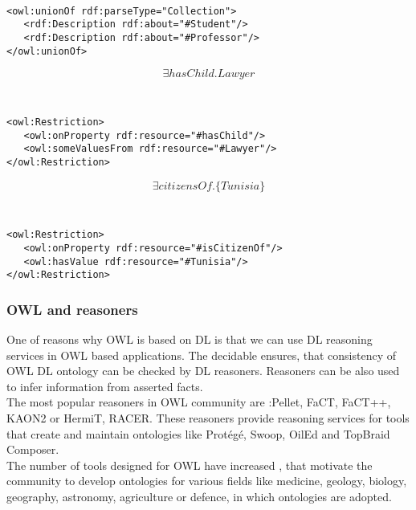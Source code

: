 {\tt \small
\begin{verbatim}
<owl:unionOf rdf:parseType="Collection">
   <rdf:Description rdf:about="#Student"/>
   <rdf:Description rdf:about="#Professor"/>
</owl:unionOf>
\end{verbatim}
}

\[
\exists \mathit{hasChild}.\mathit{Lawyer}
\]

{\tt \small
\begin{verbatim}
<owl:Restriction>
   <owl:onProperty rdf:resource="#hasChild"/>
   <owl:someValuesFrom rdf:resource="#Lawyer"/>
</owl:Restriction>
\end{verbatim}
}

\[
\exists \mathit{citizensOf}.\{\mathit{Tunisia}\}
\]

{\tt \small
\begin{verbatim}
<owl:Restriction>
   <owl:onProperty rdf:resource="#isCitizenOf"/>
   <owl:hasValue rdf:resource="#Tunisia"/>
</owl:Restriction>
\end{verbatim}
}

\bigskip

\subsubsection{OWL and reasoners}
One of reasons why OWL is based on DL is that we can use DL reasoning services in OWL based applications. The decidable ensures, that consistency of OWL DL ontology can be checked by DL reasoners. Reasoners can be also used to infer information from asserted facts.\\
The most popular reasoners in OWL community are :Pellet, FaCT, FaCT++, KAON2 or HermiT, RACER.
These reasoners provide reasoning services for tools that create and maintain ontologies like Protégé, Swoop, OilEd and TopBraid Composer.\\
The number of tools designed for OWL have increased , that motivate the community to develop ontologies for various fields like medicine, geology, biology, geography, astronomy, agriculture or defence, in which ontologies are adopted.

